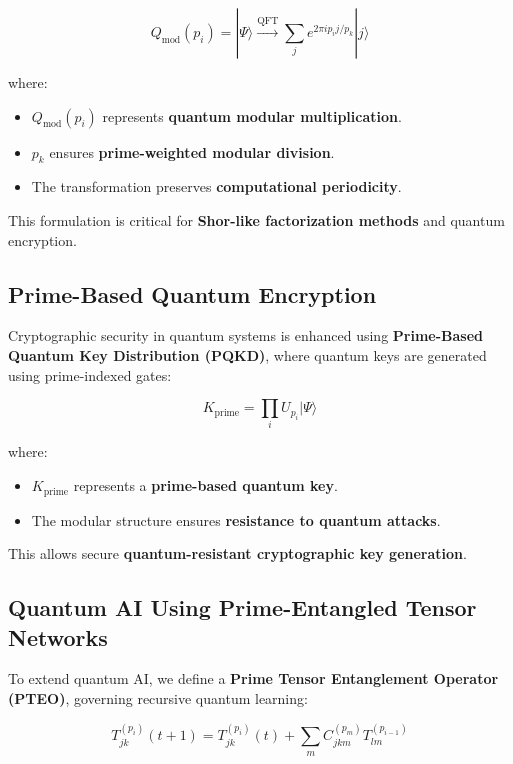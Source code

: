 \documentclass{article}
\theoremstyle{plain}
\theoremstyle{plain}
\theoremstyle{definition}
\theoremstyle{remark}
\begin{document}
\begin{equation}
Q_{\text{mod}}(p_i) = |\Psi\rangle \xrightarrow{\text{QFT}} \sum_{j} e^{2\pi i p_i j / p_k} |j\rangle
\end{equation}

where:
\begin{itemize}
    \item $Q_{\text{mod}}(p_i)$ represents \textbf{quantum modular multiplication}.
    \item $p_k$ ensures \textbf{prime-weighted modular division}.
    \item The transformation preserves \textbf{computational periodicity}.
\end{itemize}

This formulation is critical for \textbf{Shor-like factorization methods} and quantum encryption.

\subsection{Prime-Based Quantum Encryption}

Cryptographic security in quantum systems is enhanced using \textbf{Prime-Based Quantum Key Distribution (PQKD)}, where quantum keys are generated using prime-indexed gates:

\begin{equation}
K_{\text{prime}} = \prod_{i} U_{p_i} |\Psi\rangle
\end{equation}

where:
\begin{itemize}
    \item $K_{\text{prime}}$ represents a \textbf{prime-based quantum key}.
    \item The modular structure ensures \textbf{resistance to quantum attacks}.
\end{itemize}

This allows secure \textbf{quantum-resistant cryptographic key generation}.

\subsection{Quantum AI Using Prime-Entangled Tensor Networks}

To extend quantum AI, we define a \textbf{Prime Tensor Entanglement Operator (PTEO)}, governing recursive quantum learning:

\begin{equation}
T_{jk}^{(p_i)}(t+1) = T_{jk}^{(p_i)}(t) + \sum_{m} C_{jkm}^{(p_m)} T_{lm}^{(p_{i-1})}
\end{equation}
\end{document}
